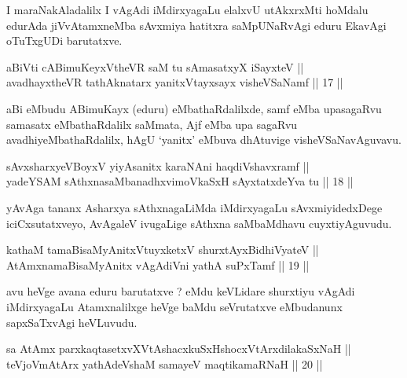 \begin{artha}
I maraNakAladalilx I vAgAdi iMdirxyagaLu elalxvU utAkxrxMti hoMdalu
edurAda jiVvAtamxneMba sAvxmiya hatitxra saMpUNaRvAgi eduru EkavAgi
oTuTxgUDi barutatxve.
\end{artha}


\begin{shl}
aBiVti cA\s \s BimuKeyxV\s theVR saM tu sAmasatxyX iSayxteV ||  \\
avadhayxtheVR tathA\s \s knatarx yanitxVtayxsayx visheVSaNamf \hfill || 17 ||
 
\end{shl}

\begin{artha}
aBi eMbudu ABimuKayx (eduru) eMbathaRdalilxde, samf eMba upasagaRvu
samasatx eMbathaRdalilx saMmata, Ajf eMba upa sagaRvu
avadhiyeMbathaRdalilx, hAgU `yanitx' eMbuva dhAtuvige visheVSaNavAguvavu.
\end{artha}

\begin{shl}
sAvxsharxyeVBoyxV yiyAsanitx karaNAni haqdiVshavxramf || \\
yadeYSAM sAthxnasaMbanadhxvimoVkaSxH sAyxtatxdeYva tu \hfill || 18 ||
  
\end{shl}

\begin{artha}
yAvAga tananx Asharxya sAthxnagaLiMda iMdirxyagaLu sAvxmiyidedxDege
iciCxsutatxveyo, AvAgaleV ivugaLige sAthxna saMbaMdhavu cuyxtiyAguvudu.
\end{artha}

\begin{shl}
kathaM tamaBisaMyAnitxVtuyxketxV shurxtAyx\s BidhiVyateV || \\
AtAmxnamaBisaMyAnitx vAgAdiVni yathA suPxTamf \hfill || 19 ||
 
\end{shl}

\begin{artha}
avu heVge avana eduru barutatxve ? eMdu keVLidare shurxtiyu vAgAdi
iMdirxyagaLu Atamxnalilxge heVge baMdu seVrutatxve eMbudanunx
sapxSaTxvAgi heVLuvudu.
\end{artha}


\begin{shl}
sa AtAmx parxkaqtasetxvXVtAshacxkuSxHshocxVtArxdilakaSxNaH ||  \\
teVjoVmAtArx yathAdeVshaM samayeV maqtikamaRNaH \hfill || 20 ||
  
\end{shl}

